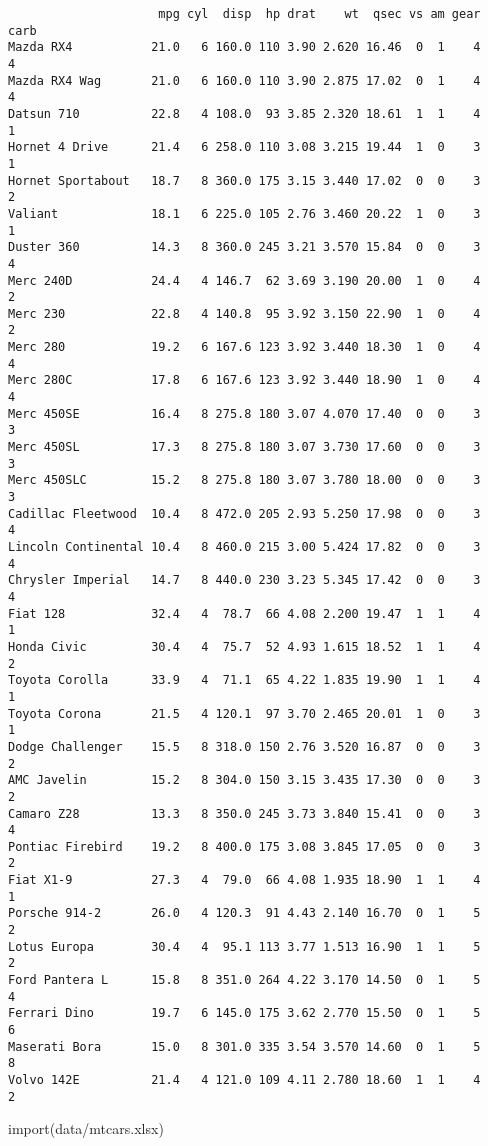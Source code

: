 \documentclass[
  letterpaper,
  DIV=11,
  numbers=noendperiod]{scrreprt}
\newenvironment{Shaded}{\begin{snugshade}}{\end{snugshade}}
\newcommand{\FunctionTok}[1]{\textcolor[rgb]{0.28,0.35,0.67}{#1}}
\newcommand{\NormalTok}[1]{\textcolor[rgb]{0.00,0.23,0.31}{#1}}
\newcommand{\StringTok}[1]{\textcolor[rgb]{0.13,0.47,0.30}{#1}}
\begin{document}
\begin{verbatim}
                     mpg cyl  disp  hp drat    wt  qsec vs am gear carb
Mazda RX4           21.0   6 160.0 110 3.90 2.620 16.46  0  1    4    4
Mazda RX4 Wag       21.0   6 160.0 110 3.90 2.875 17.02  0  1    4    4
Datsun 710          22.8   4 108.0  93 3.85 2.320 18.61  1  1    4    1
Hornet 4 Drive      21.4   6 258.0 110 3.08 3.215 19.44  1  0    3    1
Hornet Sportabout   18.7   8 360.0 175 3.15 3.440 17.02  0  0    3    2
Valiant             18.1   6 225.0 105 2.76 3.460 20.22  1  0    3    1
Duster 360          14.3   8 360.0 245 3.21 3.570 15.84  0  0    3    4
Merc 240D           24.4   4 146.7  62 3.69 3.190 20.00  1  0    4    2
Merc 230            22.8   4 140.8  95 3.92 3.150 22.90  1  0    4    2
Merc 280            19.2   6 167.6 123 3.92 3.440 18.30  1  0    4    4
Merc 280C           17.8   6 167.6 123 3.92 3.440 18.90  1  0    4    4
Merc 450SE          16.4   8 275.8 180 3.07 4.070 17.40  0  0    3    3
Merc 450SL          17.3   8 275.8 180 3.07 3.730 17.60  0  0    3    3
Merc 450SLC         15.2   8 275.8 180 3.07 3.780 18.00  0  0    3    3
Cadillac Fleetwood  10.4   8 472.0 205 2.93 5.250 17.98  0  0    3    4
Lincoln Continental 10.4   8 460.0 215 3.00 5.424 17.82  0  0    3    4
Chrysler Imperial   14.7   8 440.0 230 3.23 5.345 17.42  0  0    3    4
Fiat 128            32.4   4  78.7  66 4.08 2.200 19.47  1  1    4    1
Honda Civic         30.4   4  75.7  52 4.93 1.615 18.52  1  1    4    2
Toyota Corolla      33.9   4  71.1  65 4.22 1.835 19.90  1  1    4    1
Toyota Corona       21.5   4 120.1  97 3.70 2.465 20.01  1  0    3    1
Dodge Challenger    15.5   8 318.0 150 2.76 3.520 16.87  0  0    3    2
AMC Javelin         15.2   8 304.0 150 3.15 3.435 17.30  0  0    3    2
Camaro Z28          13.3   8 350.0 245 3.73 3.840 15.41  0  0    3    4
Pontiac Firebird    19.2   8 400.0 175 3.08 3.845 17.05  0  0    3    2
Fiat X1-9           27.3   4  79.0  66 4.08 1.935 18.90  1  1    4    1
Porsche 914-2       26.0   4 120.3  91 4.43 2.140 16.70  0  1    5    2
Lotus Europa        30.4   4  95.1 113 3.77 1.513 16.90  1  1    5    2
Ford Pantera L      15.8   8 351.0 264 4.22 3.170 14.50  0  1    5    4
Ferrari Dino        19.7   6 145.0 175 3.62 2.770 15.50  0  1    5    6
Maserati Bora       15.0   8 301.0 335 3.54 3.570 14.60  0  1    5    8
Volvo 142E          21.4   4 121.0 109 4.11 2.780 18.60  1  1    4    2
\end{verbatim}

\begin{Shaded}
\begin{Highlighting}[]
\FunctionTok{import}\NormalTok{(}\StringTok{\textquotesingle{}data/mtcars.xlsx\textquotesingle{}}\NormalTok{)}
\end{Highlighting}
\end{Shaded}
\end{document}
